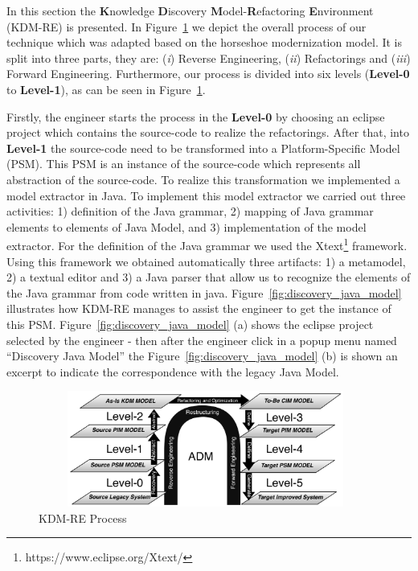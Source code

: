 In this section the \textbf{K}nowledge \textbf{D}iscovery \textbf{M}odel-\textbf{R}efactoring \textbf{E}nvironment (KDM-RE) is presented. 
In Figure~\ref{fig:process} we depict the overall process of our technique which was adapted based on the horseshoe modernization model. 
It is split into three parts, they are: 
(\textit{i}) Reverse Engineering, 
(\textit{ii}) Refactorings and 
(\textit{iii}) Forward Engineering. 
Furthermore, our process is divided into six levels (\textbf{Level-0} to \textbf{Level-1}), as can be seen in Figure~\ref{fig:process}. 

Firstly, the engineer starts the process in the \textbf{Level-0} by choosing an eclipse project which contains the source-code to realize the refactorings.  
After that, into \textbf{Level-1} the source-code need to be transformed into a Platform-Specific Model (PSM). 
This PSM is an instance of the source-code which represents all abstraction of the source-code. To realize this transformation we implemented a model extractor in Java. To implement this model extractor we carried out three activities: 1) definition of the Java grammar, 2) mapping of Java grammar elements to elements of Java Model, and 3) implementation of the model extractor. For the definition of the Java grammar we used the Xtext\footnote{https://www.eclipse.org/Xtext/} framework. Using this framework we obtained automatically three artifacts: 1) a metamodel, 2) a textual editor and 3) a Java parser that allow us to recognize the elements of the Java grammar from code written in java. 
Figure~\ref{fig:discovery_java_model} illustrates how KDM-RE manages to assist the engineer to get the instance of this PSM. Figure~\ref{fig:discovery_java_model} (a) shows the eclipse project selected by the engineer - then after the engineer click in a popup menu named ``Discovery Java Model'' the Figure~\ref{fig:discovery_java_model} (b) is shown an excerpt to indicate the correspondence with the legacy Java Model.

\begin{figure}[!ht]
\centering
  \includegraphics[width=11cm, height=3.8cm]{figure/processoDaFerramenta}
\caption{KDM-RE Process}
\label{fig:process}
\end{figure} 

